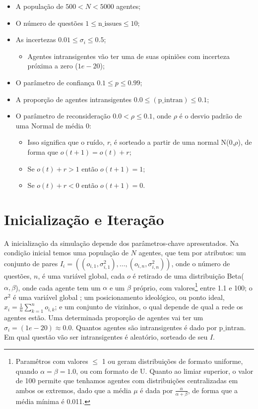 \begin{itemize}
\item A população de \(500 < N < 5000\) agentes;
\item O número de questões \(1 \leq \text{n\_issues} \leq 10\); 

\item As incertezas \(0.01 \leq \sigma_i \leq 0.5\);
  \begin{itemize}
  \item Agentes intransigentes vão ter uma de suas opiniões com incerteza
    próxima a zero (\(1e-20\));
  \end{itemize}

\item O parâmetro de confiança \(0.1 \leq p \leq 0.99\);
  
\item A proporção de agentes intransigentes \(0.0 \leq (\text{p\_intran}) \leq 0.1\);

\item O parâmetro de reconsideração \(0.0 < \rho  \leq 0.1\), onde \(\rho\) é o desvio
  padrão de uma Normal de média 0:
  \begin{itemize}
  \item Isso significa que o ruído, \textit{r}, é sorteado a partir de uma
    normal N(0,\(\rho\)), de forma que \(o(t+1) = o(t) + r\);
  \item Se \(o(t) + r > 1\) então \(o(t+1) = 1\);
  \item Se \(o(t) + r < 0\) então \(o(t+1) = 0\).
  \end{itemize}
  
\end{itemize}

\section{Inicialização e Iteração}

A inicialização da simulação depende dos parâmetros-chave apresentados. Na
condição inicial temos uma população de \(N\) agentes, que tem por atributos: um
conjunto de pares \(I_i = ((o_{i,1},\sigma_{i,1}^2), \ldots, (o_{i,n},\sigma_{i,n}^2))\), onde
o número de questões, \(n\), é uma variável global, cada \(o\) é retirado de uma
distribuição Beta(\(\alpha,\beta\)), onde cada agente tem um \(\alpha\) e um \(\beta\) próprio,
com valores\footnote{Paramêtros com valores \(\leq\) 1 ou geram distribuições de
  formato uniforme, quando \(\alpha = \beta = 1.0\), ou com formato de U. Quanto ao
  limiar superior, o valor de 100 permite que tenhamos agentes com distribuições
  centralizadas em ambos os extremos, dado que a média \(\mu\) é dada por
  \(\frac{\alpha}{\alpha + \beta}\), de forma que a média mínima é 0.011.} entre 1.1 e 100; o
\(\sigma^2\) é uma variável global ; um posicionamento ideológico, ou ponto ideal,
\(x_i = \frac{1}{n} \sum_{k = 1}^n o_{i,k} \); e um conjunto de vizinhos, o qual
depende de qual a rede os agentes estão. Uma determinada proporção de agentes
vai ter um \(\sigma_i = (1e-20 ) \approx 0.0 \). Quantos agentes são intransigentes é dado
por \(\text{p\_intran}\). Em qual questão vão ser intransigentes é aleatório,
sorteado de seu \(I\).

